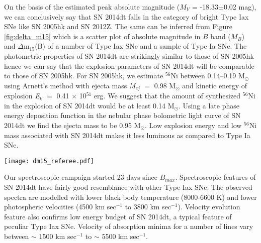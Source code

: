 \documentclass[fleqn,usenatbib]{mnras}
\begin{document}
On the basis of the estimated peak absolute magnitude ($M$$_V$ = -18.33$\pm$0.02 mag), we can conclusively say that SN 2014dt falls in the category of bright Type Iax SNe like SN 2005hk and SN 2012Z. The same can be inferred from Figure \ref{fig:delta_m15} which is a scatter plot of absolute magnitude in $B$ band ($M$$_B$) and $\Delta$m$_{15}$(B) of a number of Type Iax SNe and a sample of Type Ia SNe. The photometric properties of SN 2014dt are strikingly similar to those of SN 2005hk hence we can say that the explosion parameters of SN 2014dt will be comparable to those of SN 2005hk. For SN 2005hk, we estimate $^{56}$Ni between 0.14--0.19 M$_\odot$ using Arnett's method with ejecta mass {\it M$_{ej}$} $=$ 0.98 M$_{\odot}$ and kinetic energy of explosion {\it E$_{k}$} $=$ 0.41 $\times$ 10$^{51}$ erg. We suggest that the amount of synthesized $^{56}$Ni in the explosion of SN 2014dt would be at least 0.14 M$_\odot$. Using a late phase energy deposition function in the nebular phase bolometric light curve of SN 2014dt we find the ejecta mass to be 0.95 M$_\odot$. Low explosion energy and low $^{56}$Ni mass associated with SN 2014dt makes it less luminous as compared to Type Ia SNe.

\begin{figure*}
	\begin{center}
		\texttt{[image: dm15\_referee.pdf]}
	\end{center}
	\caption{Absolute $B$ band magnitude versus decline rate $\Delta m_{15}$ for a sample of Type Iax SNe 1991T \citep{2001ApJ...547L.103G}, 1991bg \citep{1996MNRAS.283....1T},  2000cx \citep{2001PASP..113.1178L}, 2002cx \citep{2003PASP..115..453L}, 2003gq \citep{2013ApJ...767...57F}, 2005cc (\citep{2013ApJ...767...57F}, our computed value), 2005hk \citep{2008ApJ...680..580S}, 2007qd \citep{2010ApJ...720..704M}, 2008A \citep{2013ApJ...767...57F}, 2008ae \citep{2013ApJ...767...57F}, 2008ha \citep{2009AJ....138..376F}, 2010ae \citep{2014A&A...561A.146S}, 2011ay \citep{2015MNRAS.453.2103S}, 2012Z \citep{2015A&A...573A...2S}, 2014ck \citep{2016MNRAS.459.1018T} and 2014dt (this work). Normal Type Ia SNe \citep{2006AJ....131..527J,2007ApJ...659..122J,2010ApJS..190..418G,2015A&A...573A...2S} are also shown in the Figure.}
	\label{fig:delta_m15}
\end{figure*}

Our spectroscopic campaign started 23 days since $B$$_{max}$. Spectroscopic features of SN 2014dt have fairly good resemblance with other Type Iax SNe. The observed spectra are modelled with lower black body temperature (8000-6600 K) and lower photospheric velocities (4500 km sec$^{-1}$ to 3800 km sec$^{-1}$). Velocity evolution feature also confirms low energy budget of SN 2014dt, a typical feature of peculiar Type Iax SNe. Velocity of absorption minima for a number of lines vary between $\sim$ 1500 km sec$^{-1}$ to $\sim$ 5500 km sec$^{-1}$.
\end{document}
